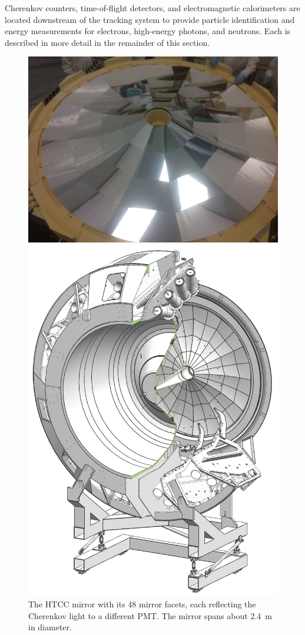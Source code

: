 \documentclass[final,3p,twocolumn]{elsarticle}
\begin{document}
Cherenkov counters, time-of-flight detectors, and electromagnetic calorimeters are located downstream of the
tracking system to provide particle identification and energy measurements for electrons, high-energy photons,
and neutrons.  Each is described in more detail in the remainder of this section.

\begin{figure}[htbp!]
\centerline{\includegraphics[angle=90,width=0.75\columnwidth]{HTCC-mirror.png}}
\caption{The HTCC mirror with its 48 mirror facets, each reflecting the Cherenkov light to a different PMT. The
  mirror spans about 2.4~m in diameter.}
\label{htcc}
\centerline{\includegraphics[width=0.9\columnwidth]{htcc-view-3.png}}

\end{figure}
\end{document}

